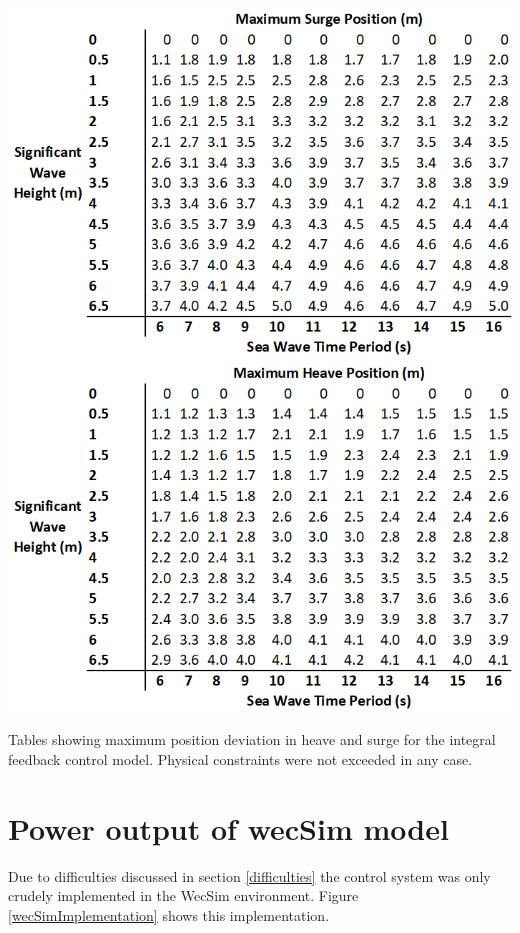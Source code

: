 \documentclass{report}
\begin{document}
\begin{table}
\centering
\includegraphics[scale=0.7]{tables/integralSurgePos}
\includegraphics[scale=0.7]{tables/integralHeavePos}
\caption{Tables showing maximum position deviation in heave and surge for the integral feedback control model. Physical constraints were not exceeded in any case.}
\label{integralPosition}
\end{table}



\FloatBarrier
\section{Power output of wecSim model}
Due to difficulties discussed in section \ref{difficulties} the control system was only crudely implemented in the WecSim environment. Figure \ref{wecSimImplementation} shows this implementation.
\end{document}
